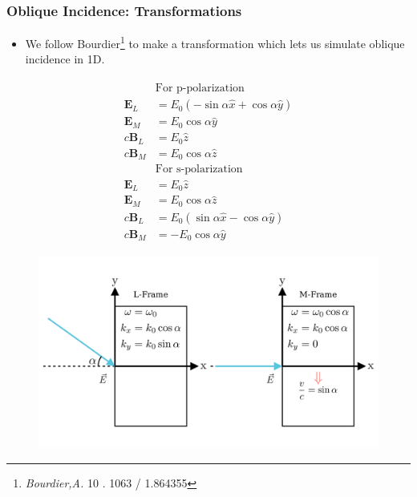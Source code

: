 \documentclass{beamer}
\begin{document}
\begin{frame}
    \frametitle{Oblique Incidence: Transformations}
    \small
    \begin{itemize}
        \item We follow Bourdier\footnote{\textit{Bourdier,A. } 10 . 1063 / 1.864355} to make a transformation which lets us simulate oblique incidence in 1D.
    \end{itemize}
    \begin{minipage}[t]{0.35\linewidth}
        \begin{align*}
            \begin{split}
                &\text{For p-polarization}\\
                \mathbf{E}_L  & = E_0(-\sin\alpha \hat{x} + \cos\alpha \hat{y}) \\
                \mathbf{E}_M  & = E_0\cos\alpha \hat{y}                         \\
                c\mathbf{B}_L & = E_0\hat{z}                                    \\
                c\mathbf{B}_M & = E_0\cos\alpha \hat{z}\\
                &\text{For s-polarization}\\
                \mathbf{E}_L & = E_0\hat{z}                                    \\
                \mathbf{E}_M & = E_0\cos\alpha \hat{z}                        \\
                c\mathbf{B}_L & = E_0(\sin\alpha \hat{x} - \cos\alpha \hat{y}) \\
                c\mathbf{B}_M & = -E_0\cos\alpha \hat{y}
            \end{split}
        \end{align*}

    \end{minipage}
    \begin{minipage}[t]{0.60\linewidth}
        \begin{figure}
            \centering
            \includegraphics[width=1.0\textwidth, height=0.62\textheight]{images/frames.png}
            \label{fig:frames}
        \end{figure}
    \end{minipage}
\end{frame}
\end{document}
